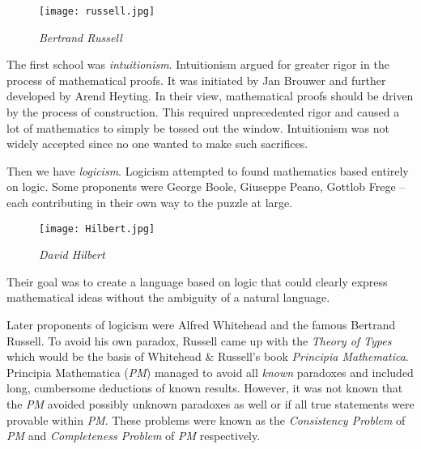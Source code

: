 \documentclass[a4paper, 12pt]{article}
\theoremstyle{definition}
\begin{document}
    \begin{wrapfigure}{r}{0.3\textwidth}
        \centering
        \vspace{-1 em}
        \texttt{[image: russell.jpg]}
        \caption[russel]{\textit{Bertrand Russell}\footnotemark}
        \vspace{-1.75 em}
    \end{wrapfigure}
    The first school was \textit{intuitionism}. Intuitionism argued for greater rigor in the process of mathematical proofs. 
    It was initiated by Jan Brouwer and further developed by Arend Heyting. In their view, mathematical proofs should be driven by the process of construction. This required 
    unprecedented rigor and caused a lot of mathematics to simply be tossed out the window. Intuitionism was not widely accepted since no one wanted to make such sacrifices. 

    Then we have \textit{logicism}. Logicism attempted to found mathematics based entirely on logic. Some proponents were 
    George Boole, Giuseppe Peano, Gottlob Frege -- each contributing in their own way to the puzzle at large.
    
    \begin{wrapfigure}{l}{0.3\textwidth}
        \centering 
        \texttt{[image: Hilbert.jpg]}
        \caption[hilbert]{\textit{David Hilbert}\footnotemark}
        \vspace{0 em}
    \end{wrapfigure}
    Their goal was to create a language based on logic that could clearly express mathematical ideas without
    the ambiguity of a natural language. 
    
    Later proponents of logicism were Alfred Whitehead and the famous Bertrand Russell. To avoid his own paradox, 
    Russell came up with the \textit{Theory of Types} which would be the basis of Whitehead \& Russell's book \textit{Principia Mathematica}. 
    Principia Mathematica (\textit{PM}) managed to avoid all \emph{known} paradoxes and included long, cumbersome deductions of known results. However, 
    it was not known that the \textit{PM} avoided possibly unknown paradoxes as well or if all true statements were 
    provable within \textit{PM}. These problems were known as the \textit{Consistency Problem} of \textit{PM} and \textit{Completeness Problem} of \textit{PM} respectively. 
    
\end{document}
